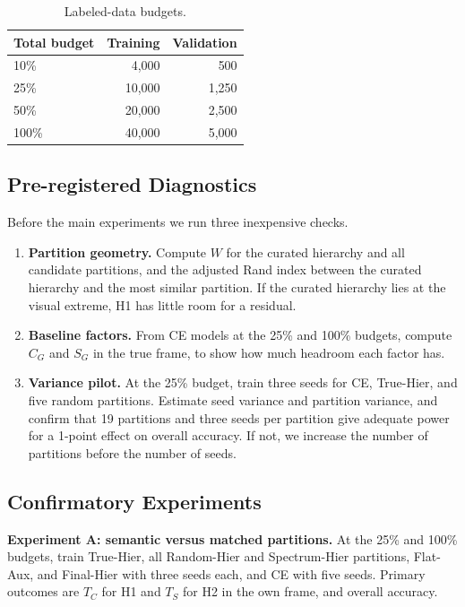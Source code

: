\documentclass[conference]{IEEEtran}
\begin{document}
\begin{table}[t]
\caption{Labeled-data budgets.}
\label{tab:budgets}
\centering
\footnotesize
\begin{tabular}{lrr}
\toprule
Total budget & Training & Validation \\
\midrule
10\%  & 4,000  & 500 \\
25\%  & 10,000 & 1,250 \\
50\%  & 20,000 & 2,500 \\
100\% & 40,000 & 5,000 \\
\bottomrule
\end{tabular}
\end{table}

\subsection{Pre-registered Diagnostics}
Before the main experiments we run three inexpensive checks.
\begin{enumerate}
  \item \textbf{Partition geometry.} Compute $W$ for the curated hierarchy and all candidate partitions, and the adjusted Rand index between the curated hierarchy and the most similar partition. If the curated hierarchy lies at the visual extreme, H1 has little room for a residual.
  \item \textbf{Baseline factors.} From CE models at the 25\% and 100\% budgets, compute $C_G$ and $S_G$ in the true frame, to show how much headroom each factor has.
  \item \textbf{Variance pilot.} At the 25\% budget, train three seeds for CE, True-Hier, and five random partitions. Estimate seed variance and partition variance, and confirm that 19 partitions and three seeds per partition give adequate power for a 1-point effect on overall accuracy. If not, we increase the number of partitions before the number of seeds.
\end{enumerate}

\subsection{Confirmatory Experiments}
\textbf{Experiment A: semantic versus matched partitions.} At the 25\% and 100\% budgets, train True-Hier, all Random-Hier and Spectrum-Hier partitions, Flat-Aux, and Final-Hier with three seeds each, and CE with five seeds. Primary outcomes are $T_C$ for H1 and $T_S$ for H2 in the own frame, and overall accuracy.
\end{document}
